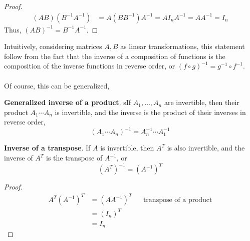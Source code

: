 \documentclass[letterpaper,12pt]{article}
\begin{document}
\begin{proof}
\begin{align*}
    (AB)(B^{-1}A^{-1}) & = A(BB^{-1})A^{-1} = AI_n A^{-1} = AA^{-1} = I_n
\end{align*}
Thus, $(AB)^{-1} = B^{-1} A^{-1}$.
\end{proof}

Intuitively, considering matrices $A, B$ as linear transformations, this statement follow from the fact that the inverse of a composition of functions is the composition of the inverse functions in reverse order, or $(f \circ g)^{-1} = g^{-1} \circ f^{-1}$.
\\ \\ Of course, this can be generalized,
\begin{theorem}
\textbf{Generalized inverse of a product}. sIf $A_1, \dots, A_n$ are invertible, then their product $A_1 \cdots A_n$ is invertible, and the inverse is the product of their inverses in reverse order,
\begin{equation*}
    (A_1 \cdots A_n)^{-1} = A_n^{-1} \cdots A_1^{-1}
\end{equation*}
\end{theorem}

\begin{theorem}
\textbf{Inverse of a transpose}. If $A$ is invertible, then $A^T$ is also invertible, and the inverse of $A^T$ is the transpose of $A^{-1}$, or
\begin{equation*}
    (A^T)^{-1} = (A^{-1})^T
\end{equation*}
\end{theorem}

\begin{proof}
\begin{align*}
    A^T (A^{-1})^T & = (AA^{-1})^T && \text{transpose of a product} \\
    & = (I_n)^T \\
    & = I_n
\end{align*}
\end{proof}
\end{document}
